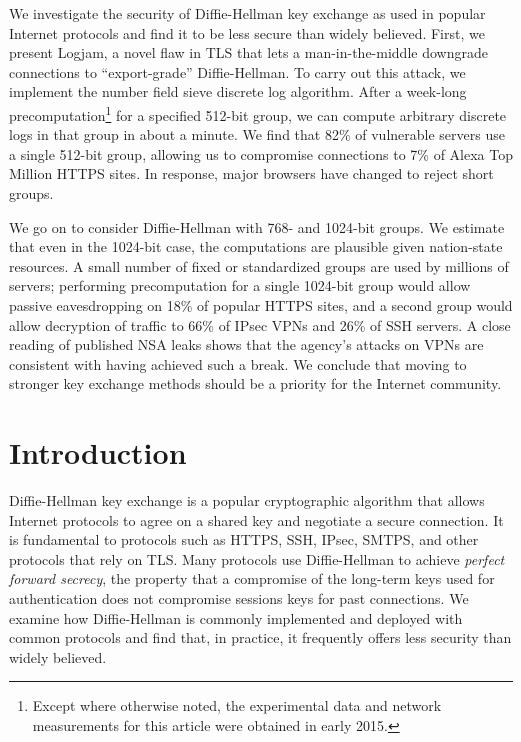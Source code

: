 
We investigate the security of Diffie-Hellman key exchange as used in popular
Internet protocols and find it to be less secure than widely believed. First,
we present Logjam, a novel flaw in TLS that lets a man-in-the-middle
downgrade connections to ``export-grade'' Diffie-Hellman. To carry out this
attack, we implement the number field sieve discrete log algorithm. After a
week-long precomputation\footnote{\small Except where otherwise noted, the
experimental data and network measurements for this article were obtained in
early 2015.} for a specified 512-bit group, we can compute arbitrary discrete
logs in that group in about a minute. We find that 82\% of vulnerable servers
use a single 512-bit group, allowing us to compromise connections to 7\% of
Alexa Top Million HTTPS sites. In response, major browsers have changed to
reject short groups.

We go on to consider Diffie-Hellman with 768- and 1024-bit groups. We
estimate that even in the 1024-bit case, the computations are plausible given
nation-state resources. A small number of fixed or standardized groups are
used by millions of servers; performing precomputation for a single 1024-bit
group would allow passive eavesdropping on 18\% of popular HTTPS sites, and a
second group would allow decryption of traffic to 66\% of IPsec VPNs and 26\%
of SSH servers. A close reading of published NSA leaks shows that the
agency's attacks on VPNs are consistent with having achieved such a break. We
conclude that moving to stronger key exchange methods should be a priority
for the Internet community.

\section{Introduction}

Diffie-Hellman key exchange is a popular cryptographic algorithm that allows
Internet protocols to agree on a shared key and negotiate a secure
connection. It is fundamental to protocols such as HTTPS, SSH, IPsec, SMTPS,
and other protocols that rely on TLS\@. Many protocols use Diffie-Hellman to
achieve \emph{perfect forward secrecy}, the property that a compromise of the
long-term keys used for authentication does not compromise sessions keys for
past connections. We examine how Diffie-Hellman is commonly implemented and
deployed with common protocols and find that, in practice, it frequently
offers less security than widely believed.

